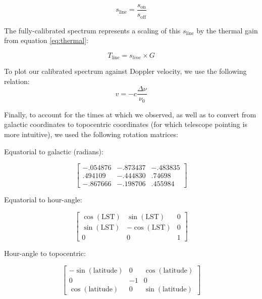 \documentclass[12pt]{article}
\begin{document}
\begin{equation}
s_\text{line} = \frac{s_\text{on}}{s_\text{off}}
\end{equation}

The fully-calibrated spectrum represents a scaling of this $s_\text{line}$ by the thermal gain from equation \ref{eq:thermal}:

\begin{equation} \label{eq:normalize}
T_\text{line} = s_{line} \times G
\end{equation}

To plot our calibrated spectrum against Doppler velocity, we use the following relation:
\begin{equation} \label{eq:velocity}
v = -c \frac{\Delta \nu}{\nu_0}
\end{equation}

Finally, to account for the times at which we observed, as well as to convert from galactic coordinates to topocentric coordinates (for which telescope pointing is more intuitive), we used the following rotation matrices:

Equatorial to galactic (radians):

\begin{equation}
\begin{bmatrix}
-.054876 & -.873437 & -.483835 \\
.494109 & -.444830 & .74698 \\
-.867666 & -.198706 & .455984
\end{bmatrix}
\end{equation}

Equatorial to hour-angle:

\begin{equation}
\begin{bmatrix}
\cos(\text{LST}) & \sin(\text{LST}) & 0 \\
\sin(\text{LST}) & -\cos(\text{LST}) & 0 \\
0 & 0 & 1
\end{bmatrix}
\end{equation}

Hour-angle to topocentric:

\begin{equation}
\begin{bmatrix}
-\sin(\text{latitude}) & 0 & \cos(\text{latitude}) \\
0 & -1 & 0 \\
\cos(\text{latitude}) & 0 & \sin(\text{latitude})
\end{bmatrix}
\end{equation}
\end{document}

